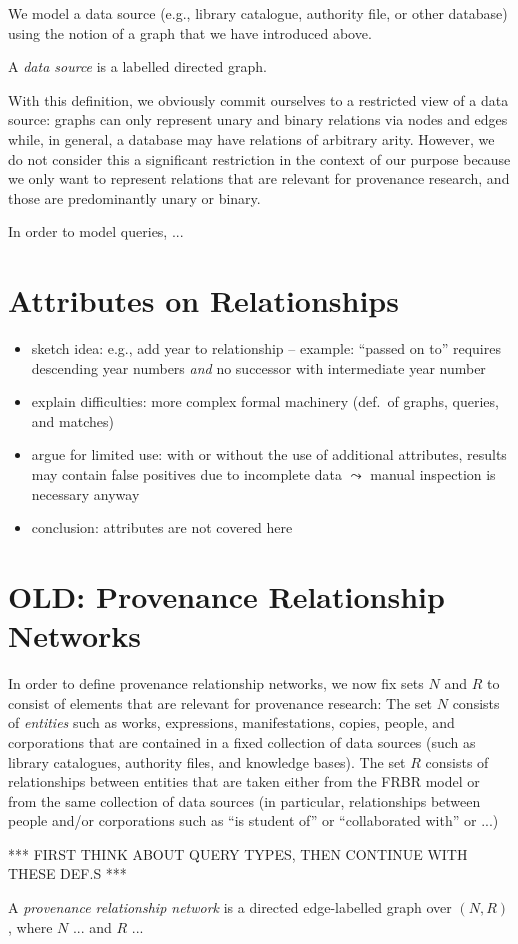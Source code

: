 We model a data source (e.g., library catalogue, authority file, or other database)
using the notion of a graph that we have introduced above.
%
\begin{definition}
  A \emph{data source} is a labelled directed graph.
\end{definition}
%
With this definition, we obviously commit ourselves to a restricted view of a data source:
graphs can only represent unary and binary relations via nodes and edges
while, in general, a database may have relations of arbitrary arity.
However, we do not consider this a significant restriction in the context of our purpose
because we only want to represent relations that are relevant for provenance research,
and those are predominantly unary or binary. 

In order to model queries, ...


\section{Attributes on Relationships}


\begin{itemize}
  \item
    sketch idea: e.g., add year to relationship  -- example: ``passed on to'' requires descending year numbers \emph{and} no successor with intermediate year number
  \item
    explain difficulties: more complex formal machinery (def.\ of graphs, queries, and matches)
  \item
    argue for limited use: with or without the use of additional attributes, results may contain false positives due to incomplete data $\leadsto$ manual inspection is necessary anyway
  \item
    conclusion: attributes are not covered here
\end{itemize}



\section{OLD: Provenance Relationship Networks}

In order to define provenance relationship networks, we now fix sets $N$ and $R$ to consist
of elements that are relevant for provenance research:
The set $N$ consists of \emph{entities} such as 
works, expressions, manifestations, copies, people, and corporations
that are contained in a fixed collection of data sources (such as library catalogues,
authority files, and knowledge bases). The set $R$ consists of relationships
between entities that are taken either from the FRBR model
or from the same collection of data sources (in particular, relationships between people and/or corporations
such as ``is student of'' or ``collaborated with'' or ...)

*** FIRST THINK ABOUT QUERY TYPES, THEN CONTINUE WITH THESE DEF.S ***


A \emph{provenance relationship network} is a directed edge-labelled graph over $(N,R)$,
where $N$ ... and $R$ ... 
